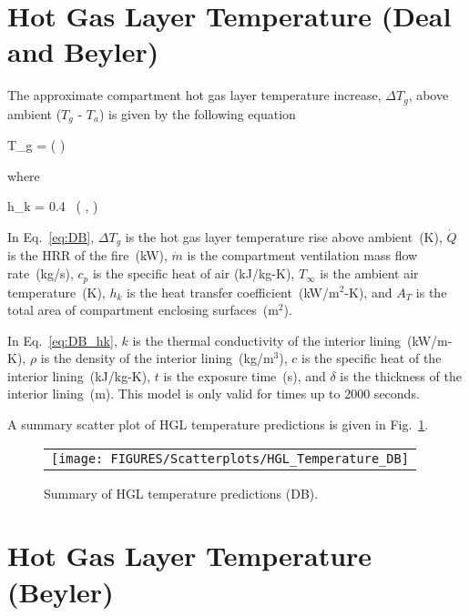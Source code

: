 \clearpage


\section{Hot Gas Layer Temperature (Deal and Beyler)}

The approximate compartment hot gas layer temperature increase, $\Delta T_g$, above ambient ($T_g$ - $T_a$) is given by the following equation

\be
\Delta T_g = \left(  \right)
\label{eq:DB}
\ee

\noindent where

\be
h_k = 0.4\  \left(  ,  \right)
\label{eq:DB_hk}
\ee

In Eq.~\ref{eq:DB}, $\Delta T_g$ is the hot gas layer temperature rise above ambient~(K), $\dot Q$ is the HRR of the fire~(kW), $\dot m$ is the compartment ventilation mass flow rate~(kg/s), $c_p$ is the specific heat of air (kJ/kg-K), $T_\infty$ is the ambient air temperature~(K), $h_k$ is the heat transfer coefficient~(kW/m$^2$-K), and $A_T$ is the total area of compartment enclosing surfaces~(m$^2$).

In Eq.~\ref{eq:DB_hk}, $k$ is the thermal conductivity of the interior lining~(kW/m-K), $\rho$ is the density of the interior lining~(kg/m$^3$), $c$ is the specific heat of the interior lining~(kJ/kg-K), $t$ is the exposure time~(s), and $\delta$ is the thickness of the interior lining~(m). This model is only valid for times up to 2000 seconds.

\clearpage

A summary scatter plot of HGL temperature predictions is given in Fig.~\ref{hgl_temperature_DB_summary}.

\begin{figure}[ht]
\begin{center}
\begin{tabular}{l}
\texttt{[image: FIGURES/Scatterplots/HGL\_Temperature\_DB]}
\end{tabular}
\end{center}
\caption[Summary of HGL temperature predictions (DB).]
{Summary of HGL temperature predictions (DB).}
\label{hgl_temperature_DB_summary}
\end{figure}


\clearpage


\section{Hot Gas Layer Temperature (Beyler)}

